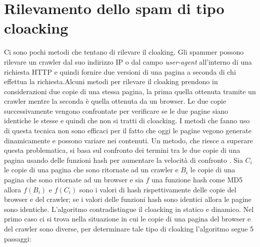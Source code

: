 \section{Rilevamento dello spam di tipo cloacking}
Ci sono pochi metodi che tentano di rilevare il cloaking. Gli spammer possono rilevare un crawler dal suo indirizzo IP o dal campo \textit{user-agent} all'interno di una richiesta HTTP e quindi fornire due versioni di una pagina a seconda di chi effettua la richiesta.Alcuni metodi per rilevare il cloaking prendono in considerazioni due copie di una stessa pagina, la prima  quella ottenuta tramite un crawler mentre la seconda è quella ottenuta da un browser. Le due copie successivamente vengono confrontate per verificare se le due pagine siano identiche le stesse e quindi che non si tratti di cloacking. I metodi che fanno uso di questa tecnica non sono efficaci per il fatto che oggi le pagine vegono generate dinamicamente e possono variare nei contenuti. Un metodo, che riesce a superare questa problematica, si basa sul confronto dei termini tra le due copie di una pagina usando delle funzioni hash per aumentare la velocità di confronto \cite{Ghiam:2013cloaking}. Sia \(C_i\) le copie di una pagina che sono 
ritornate ad un crawler e \(B_i\) le copie di una pagina che sono ritornate ad un browser e sia \(f\) una funzione hash come MD5 allora \(f(B_i)\) e \(f(C_i)\) sono i valori di hash rispettivamente delle copie del browser e del crawler; se i valori delle funzioni hash sono identici allora le pagine sono identiche. L'algoritmo contradistingue il cloacking in statico e dinamico. Nel primo caso ci si trova nella situazione in cui le copie di una pagina del browser e del crawler sono diverse, per determinare tale tipo di cloaking l'algoritmo segue 5 passaggi:
